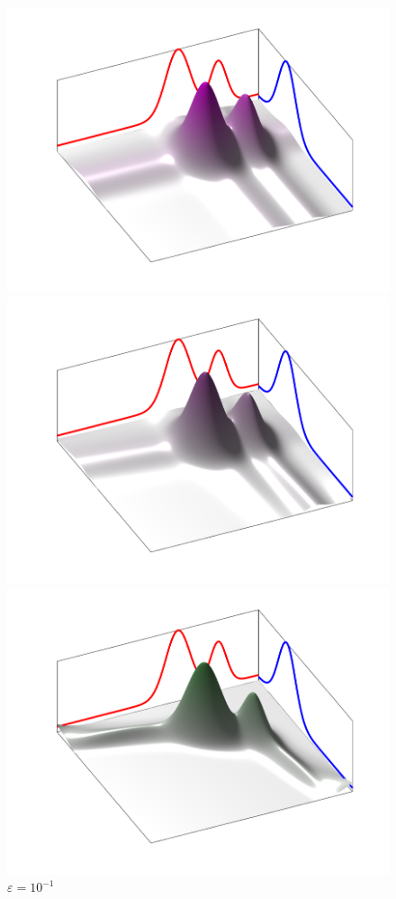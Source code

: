\documentclass[cn,10pt,math=newtx,citestyle=gb7714-2015,bibstyle=gb7714-2015]{elegantbook}
\begin{document}
\begin{figure}[H]
	\begin{minipage}{0.20\linewidth}
		\centering
		\includegraphics[width=0.95\linewidth]{figure/fig4.2/evol-3d-1.png}
		\caption*{$\varepsilon = 1$}
	\end{minipage}
	\begin{minipage}{0.20\linewidth}
		\centering
		\includegraphics[width=0.95\linewidth]{figure/fig4.2/evol-3d-17.png}
		\caption*{$\varepsilon = 10^{-1}$}
	\end{minipage}
	\begin{minipage}{0.20\linewidth}
		\centering
		\includegraphics[width=0.95\linewidth]{figure/fig4.2/evol-3d-33.png}

\end{minipage}
\end{figure}
\end{document}
